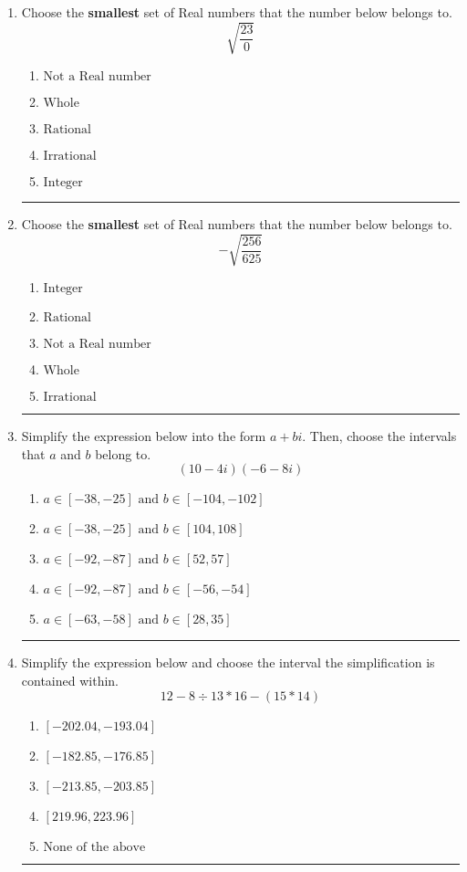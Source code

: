 \documentclass[14pt]{extbook}
\newcommand{\litem}[1]{\item#1\hspace*{-1cm}\rule{\textwidth}{0.4pt}}
\begin{document}
\begin{enumerate}
{\begin{enumerate}[label=\Alph*.]
\end{enumerate} }
\litem{
Choose the \textbf{smallest} set of Real numbers that the number below belongs to.\[ \sqrt{\frac{23}{0}} \]\begin{enumerate}[label=\Alph*.]
\item \( \text{Not a Real number} \)
\item \( \text{Whole} \)
\item \( \text{Rational} \)
\item \( \text{Irrational} \)
\item \( \text{Integer} \)

\end{enumerate} }
\litem{
Choose the \textbf{smallest} set of Real numbers that the number below belongs to.\[ -\sqrt{\frac{256}{625}} \]\begin{enumerate}[label=\Alph*.]
\item \( \text{Integer} \)
\item \( \text{Rational} \)
\item \( \text{Not a Real number} \)
\item \( \text{Whole} \)
\item \( \text{Irrational} \)

\end{enumerate} }
\litem{
Simplify the expression below into the form $a+bi$. Then, choose the intervals that $a$ and $b$ belong to.\[ (10 - 4 i)(-6 - 8 i) \]\begin{enumerate}[label=\Alph*.]
\item \( a \in [-38, -25] \text{ and } b \in [-104, -102] \)
\item \( a \in [-38, -25] \text{ and } b \in [104, 108] \)
\item \( a \in [-92, -87] \text{ and } b \in [52, 57] \)
\item \( a \in [-92, -87] \text{ and } b \in [-56, -54] \)
\item \( a \in [-63, -58] \text{ and } b \in [28, 35] \)

\end{enumerate} }
\litem{
Simplify the expression below and choose the interval the simplification is contained within.\[ 12 - 8 \div 13 * 16 - (15 * 14) \]\begin{enumerate}[label=\Alph*.]
\item \( [-202.04, -193.04] \)
\item \( [-182.85, -176.85] \)
\item \( [-213.85, -203.85] \)
\item \( [219.96, 223.96] \)
\item \( \text{None of the above} \)


\end{enumerate}}
\end{enumerate}
\end{document}
